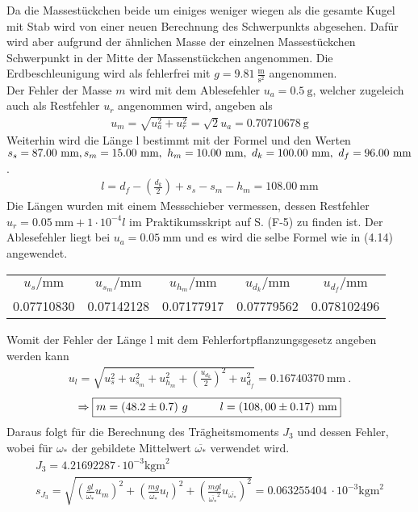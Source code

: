 Da die Massestückchen beide um einiges weniger wiegen als die gesamte Kugel mit Stab wird von einer neuen Berechnung des Schwerpunkts abgesehen. Dafür wird aber aufgrund der ähnlichen Masse der einzelnen Massestückchen Schwerpunkt in der Mitte der Massenstückchen angenommen. Die Erdbeschleunigung wird als fehlerfrei mit $g=9.81~\frac{\text{m}}{\text{s}^2}$ angenommen. \\
Der Fehler der Masse $m$ wird mit dem Ablesefehler $u_a=0.5~\text{g}$, welcher zugeleich auch als Restfehler $u_r$ angenommen wird, angeben als
\begin{align}
    u_m=\sqrt{u_a^2+u_r^2}=\sqrt{2}u_a=0.70710678~\text{g}
\end{align}
Weiterhin wird die Länge l bestimmt mit der Formel und den Werten $s_s=87.00~\text{mm},~\\s_m=15.00~\text{mm},~h_m=10.00~\text{mm},~d_k=100.00~\text{mm},~d_f=96.00~\text{mm}$.
\begin{align}
    l = d_f - \left(\frac{d_k}{2}\right) + s_s - s_m - h_m=108.00~\text{mm} 
\end{align}
Die Längen wurden mit einem Messschieber vermessen, dessen Restfehler \\ $u_r=0.05~\text{mm}+1\cdot10^{-4}l$ im Praktikumsskript auf S. (F-5) zu finden ist. Der Ablesefehler liegt bei $u_a=0.05~\text{mm}$ und es wird die selbe Formel wie in (4.14) angewendet.
\begin{center}
    \begin{tabular}{ccccc}
        \rowcolor[rgb]{ .741,  .843,  .933}  $u_{s}/\text{mm} $ &  $u_{s_m}/\text{mm}$ &  $u_{h_m}/\text{mm}$ &  $u_{d_k}/\text{mm}$ &  $u_{d_f}/\text{mm}$\\
        0.07710830 & 0.07142128 & 0.07177917 & 0.07779562 & 0.078102496
    \end{tabular}
\end{center}
Womit der Fehler der Länge l mit dem Fehlerfortpflanzungsgesetz angeben werden kann
\begin{align}
    u_l=\sqrt{u_s^2+u_{s_m}^2+u_{h_m}^2+\left(\frac{u_{d_k}}{2}\right)^2+u_{d_f}^2}=0.16740370~\text{mm}~.
\end{align}
\begin{align*}
    \Rightarrow\boxed{m=(48.2\pm0.7)~g\tab l=(108,00\pm0.17)~\text{mm}}
\end{align*}
Daraus folgt für die Berechnung des Trägheitsmoments $J_3$ und dessen Fehler, wobei für $\omega_*$ der gebildete Mittelwert $\overline{\omega_*}$ verwendet wird. 
\begin{gather}
    J_3 = 4.21692287\cdot10^{-3}\text{kgm}^2 \\
    s_{J_3}=\sqrt{\left(\frac{gl}{\overline{\omega_*}}u_m\right)^2+\left(\frac{mg}{\overline{\omega_*}}u_l\right)^2+\left(\frac{mgl}{\overline{\omega_*}^2}u_{\overline{\omega_*}}\right)^2}=0.063255404~\cdot10^{-3}\text{kgm}^2
\end{gather}
